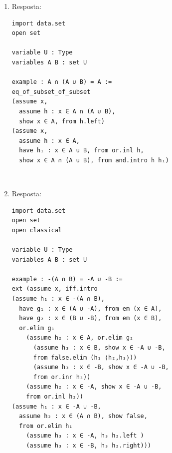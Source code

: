 \begin{enumerate}
\begin{enumerate}
\begin{lstlisting}
variable U : Type
variables A B C : set U

example : A ∪ (B ∩ C) = (A ∪ B) ∩ (A ∪ C) :=
eq_of_subset_of_subset
(assume x,
assume h : x ∈ A ∪ (B ∩ C),
or.elim h
  (assume h₁ : x ∈ A,
  have h₂ : x ∈ A ∪ B, from or.inl h₁,
  have h₃ : x ∈ A ∪ C, from or.inl h₁,
  show x ∈ (A ∪ B) ∩ (A ∪ C), from and.intro h₂ h₃)
  (assume h₁ : x ∈ B ∩ C,
  have h₂ : x ∈ B, from and.left h₁,
  have h₃ : x ∈ C, from and.right h₁,
  have h₄ : x ∈ A ∪ B, from or.inr h₂,
  have h₅ : x ∈ A ∪ C, from or.inr h₃,
  show x ∈ (A ∪ B) ∩ (A ∪ C), from and.intro h₄ h₅))
(assume x,
assume h : x ∈ (A ∪ B) ∩ (A ∪ C),
have h₁ : x ∈ A ∪ B, from and.left h,
have h₂ : x ∈ A ∪ C, from and.right h,
or.elim h₁
  (assume h₃ : x ∈ A,
  show x ∈ A ∪ (B ∩ C), from or.inl h₃)
  (assume h₃ : x ∈ B,
  or.elim h₂
    (assume h₄ : x ∈ A,
    show x ∈ A ∪ (B ∩ C), from or.inl h₄)
    (assume h₄ : x ∈ C,
    have h₅ : x ∈ B ∩ C, from and.intro h₃ h₄,
    show x ∈ A ∪ (B ∩ C), from or.inr h₅)))\end{lstlisting}

$\qquad$

\item Resposta:
\begin{lstlisting}
import data.set
open set

variable U : Type
variables A B : set U

example : A ∩ (A ∪ B) = A :=
eq_of_subset_of_subset
(assume x,
  assume h : x ∈ A ∩ (A ∪ B),
  show x ∈ A, from h.left)
(assume x,
  assume h : x ∈ A,
  have h₁ : x ∈ A ∪ B, from or.inl h,
  show x ∈ A ∩ (A ∪ B), from and.intro h h₁) \end{lstlisting}

$\qquad$

\item Resposta:
\begin{lstlisting}
import data.set
open set
open classical

variable U : Type
variables A B : set U

example : -(A ∩ B) = -A ∪ -B :=
ext (assume x, iff.intro
(assume h₁ : x ∈ -(A ∩ B),
  have g₁ : x ∈ (A ∪ -A), from em (x ∈ A),
  have g₂ : x ∈ (B ∪ -B), from em (x ∈ B),
  or.elim g₁
    (assume h₂ : x ∈ A, or.elim g₂
      (assume h₃ : x ∈ B, show x ∈ -A ∪ -B,
      from false.elim (h₁ ⟨h₂,h₃⟩))
      (assume h₃ : x ∈ -B, show x ∈ -A ∪ -B,
      from or.inr h₃))
    (assume h₂ : x ∈ -A, show x ∈ -A ∪ -B,
    from or.inl h₂))
(assume h₁ : x ∈ -A ∪ -B,
  assume h₂ : x ∈ (A ∩ B), show false,
  from or.elim h₁
    (assume h₃ : x ∈ -A, h₃ h₂.left )
    (assume h₃ : x ∈ -B, h₃ h₂.right)))


\end{lstlisting}
\end{enumerate}
\end{enumerate}
